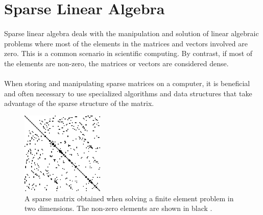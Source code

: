 \section{Sparse Linear Algebra}
\paragraph*{}
Sparse linear algebra deals with the manipulation and solution of linear algebraic problems where most of the elements in the matrices and vectors involved are zero. This is a common scenario in scientific computing. By contrast, if most of the elements are non-zero, the matrices or vectors are considered dense.

\paragraph*{}
When storing and manipulating sparse matrices on a computer, it is beneficial and often necessary to use specialized algorithms and data structures that take advantage of the sparse structure of the matrix.

\begin{figure}[h]
\includegraphics[width=0.35\textwidth]{assets/figures/Finite_element_sparse_matrix.png}
\centering
\caption{A sparse matrix obtained when solving a finite element problem in two dimensions. The non-zero elements are shown in black \cite{SparseMatrixPNG}.}
\end{figure}

